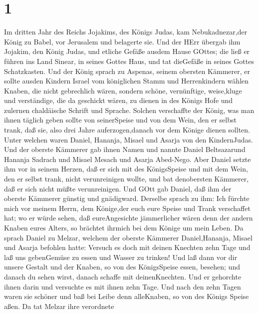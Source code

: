 \hypertarget{section}{%
\section{1}\label{section}}

 Im dritten Jahr des Reichs Jojakims, des Königs Judas, kam
Nebukadnezar,der König zu Babel, vor Jerusalem und belagerte sie.
 Und der HErr übergab ihm Jojakim, den König Judas, und
etliche Gefäße ausdem Hause GOttes; die ließ er führen ins Land Sinear,
in seines Gottes Haus, und tat dieGefäße in seines Gottes Schatzkasten.
 Und der König sprach zu Aspenas, seinem obersten Kämmerer,
er sollte ausden Kindern Israel vom königlichen Stamm und Herrenkindern
wählen  Knaben, die nicht gebrechlich wären, sondern schöne,
vernünftige, weise,kluge und verständige, die da geschickt wären, zu
dienen in des Königs Hofe und zulernen chaldäische Schrift und Sprache.
 Solchen verschaffte der König, was man ihnen täglich geben
sollte von seinerSpeise und von dem Wein, den er selbst trank, daß sie,
also drei Jahre auferzogen,danach vor dem Könige dienen sollten.
 Unter welchen waren Daniel, Hananja, Misael und Asarja von
den KindernJudas.  Und der oberste Kämmerer gab ihnen Namen
und nannte Daniel Beltsazarund Hananja Sadrach und Misael Mesach und
Asarja Abed-Nego.  Aber Daniel setzte ihm vor in seinem
Herzen, daß er sich mit des KönigsSpeise und mit dem Wein, den er selbst
trank, nicht verunreinigen wollte, und bat denobersten Kämmerer, daß er
sich nicht müßte verunreinigen.  Und GOtt gab Daniel, daß
ihm der oberste Kämmerer günstig und gnädigward.  Derselbe
sprach zu ihm: Ich fürchte mich vor meinem Herrn, dem Könige,der euch
eure Speise und Trank verschaffet hat; wo er würde sehen, daß
eureAngesichte jämmerlicher wären denn der andern Knaben eures Alters,
so brächtet ihrmich bei dem Könige um mein Leben.  Da
sprach Daniel zu Melzar, welchem der oberste Kämmerer Daniel,Hananja,
Misael und Asarja befohlen hatte:  Versuch es doch mit
deinen Knechten zehn Tage und laß uns gebenGemüse zu essen und Wasser zu
trinken!  Und laß dann vor dir unsere Gestalt und der
Knaben, so von des KönigsSpeise essen, besehen; und danach du sehen
wirst, danach schaffe mit deinenKnechten.  Und er gehorchte
ihnen darin und versuchte es mit ihnen zehn Tage.  Und nach
den zehn Tagen waren sie schöner und baß bei Leibe denn alleKnaben, so
von des Königs Speise aßen.  Da tat Melzar ihre verordnete
